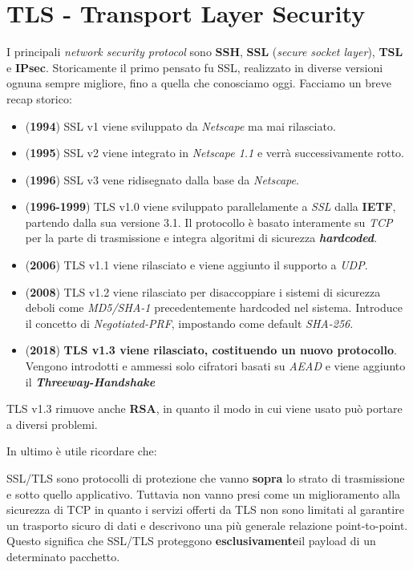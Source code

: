 \chapter{TLS - Transport Layer Security}
I principali \textit{network security protocol} sono \textbf{SSH}, \textbf{SSL} (\textit{secure socket layer}), \textbf{TSL} e \textbf{IPsec}. Storicamente il primo pensato fu SSL, realizzato in diverse versioni ognuna sempre migliore, fino a quella che conosciamo oggi. Facciamo un breve recap storico:
\begin{itemize}
    \item (\textbf{1994}) SSL v1 viene sviluppato da \textit{Netscape} ma mai rilasciato.
    \item (\textbf{1995}) SSL v2 viene integrato in \textit{Netscape 1.1} e verrà successivamente rotto.
    \item(\textbf{1996}) SSL v3 vene ridisegnato dalla base da \textit{Netscape}.
    \item(\textbf{1996-1999}) TLS v1.0 viene sviluppato parallelamente a \textit{SSL} dalla \textbf{IETF}, partendo dalla sua versione 3.1. Il protocollo è basato interamente su \textit{TCP} per la parte di trasmissione e integra algoritmi di sicurezza \textbf{\textit{hardcoded}}.
    \item(\textbf{2006}) TLS v1.1 viene rilasciato e viene aggiunto il supporto a \textit{UDP}. 
    \item(\textbf{2008}) TLS v1.2 viene rilasciato per disaccoppiare i sistemi di sicurezza deboli come \textit{MD5/SHA-1} precedentemente hardcoded nel sistema. Introduce il concetto di \textit{Negotiated-PRF}, impostando come default \textit{SHA-256}.
    \item(\textbf{2018}) \textbf{TLS v1.3 viene rilasciato, costituendo un nuovo protocollo}. Vengono introdotti e ammessi solo cifratori basati su \textit{AEAD} e viene aggiunto il \textbf{\textit{Threeway-Handshake}}
\end{itemize}
\begin{note}
TLS v1.3 rimuove anche \textbf{RSA}, in quanto il modo in cui viene usato può portare a diversi problemi.
\end{note}
In ultimo è utile ricordare che:
\begin{proposition}
SSL/TLS sono protocolli di protezione che vanno \textbf{sopra} lo strato di trasmissione e sotto quello applicativo. Tuttavia non vanno presi come un miglioramento alla sicurezza di TCP in quanto i servizi offerti da TLS non sono limitati al garantire un trasporto sicuro di dati e descrivono una più generale relazione point-to-point.\\
Questo significa che SSL/TLS proteggono \textbf{esclusivamente}\footnotemark il payload di un determinato pacchetto.
\end{proposition}\pagebreak
